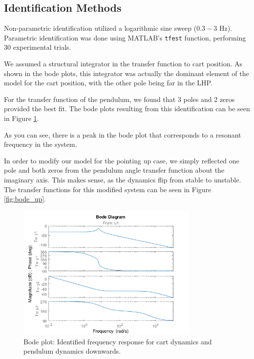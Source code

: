 \documentclass[12pt]{article}
\begin{document}
\subsection{Identification Methods}

Non-parametric identification utilized a logarithmic sine sweep ($0.3-3$ Hz). Parametric identification was done using MATLAB's \texttt{tfest} function, performing 30 experimental trials.

We assumed a structural integrator in the transfer function to cart position. As shown in the bode plots, this integrator was actually the dominant element of the model for the cart position, with the other pole being far in the LHP.

For the transfer function of the pendulum, we found that 3 poles and 2 zeros provided the best fit. The bode plots resulting from this identification can be seen in Figure \ref{fig:bode_down}.

As you can see, there is a peak in the bode plot that corresponds to a resonant frequency in the system.

In order to modify our model for the pointing up case, we simply reflected one pole and both zeros from the pendulum angle transfer function about the imaginary axis. This makes sense, as the dynamics flip from stable to unstable. The transfer functions for this modified system can be seen in Figure \ref{fig:bode_up}.



\begin{figure}[H]
    \centering
    \includegraphics[width=0.8\textwidth]{../plots/bode_down.png}
    \caption{Bode plot: Identified frequency response for cart dynamics and pendulum dynamics downwards.}
    \label{fig:bode_down}
\end{figure}
\end{document}
